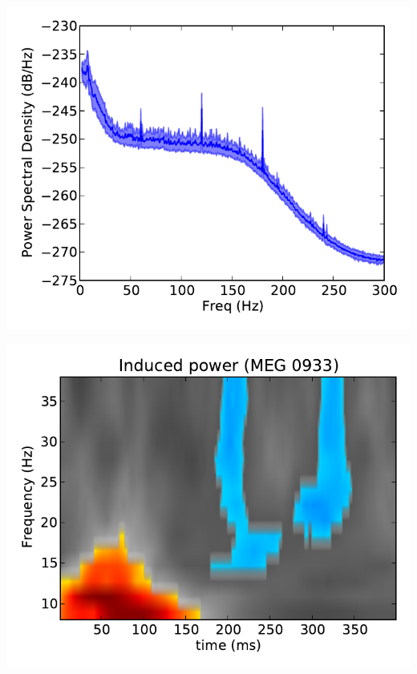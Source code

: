 \documentclass[slidestop,11pt,compress,serif]{beamer} %
\newcommand{\vfillll}{\vfilll\vfilll\vfilll\vfilll\vfilll\vfilll\vfilll\vfilll\vfilll\vfilll\vfilll\vfilll\vfilll\vfilll\vfilll\vfilll\vfilll\vfilll\vfilll\vfilll\vfilll\vfilll\vfilll\vfilll\vfilll\vfilll\vfilll\vfilll\vfilll\vfilll\vfilll\vfilll\vfilll\vfilll\vfilll\vfilll\vfilll\vfilll\vfilll\vfilll}
\begin{document}
\begin{frame}[plain,t]
\vfillll


\vfillll


\begin{minipage}{.27\linewidth}
    \includegraphics[width=\linewidth]{psd.pdf}%
\end{minipage}%
\hfill%
\begin{minipage}{.27\linewidth}
    \includegraphics[width=\linewidth]{stats_cluster_tfr.pdf}

\end{minipage}
\end{frame}
\end{document}
